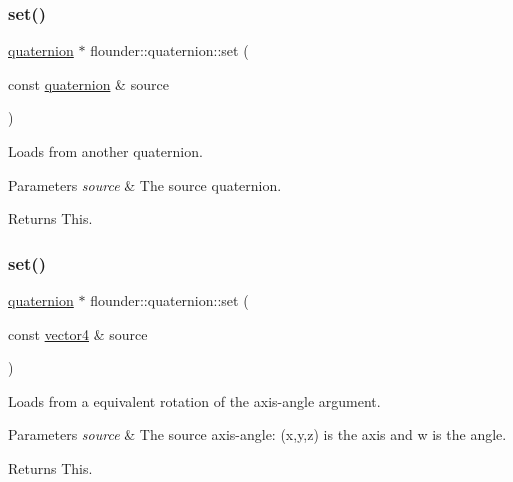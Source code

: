 \subsubsection{\texorpdfstring{set()}{set()}\hspace{0.1cm}{\footnotesize\ttfamily [2/5]}}
{\footnotesize\ttfamily \hyperlink{classflounder_1_1quaternion}{quaternion} $\ast$ flounder\+::quaternion\+::set (\begin{DoxyParamCaption}\item[{const \hyperlink{classflounder_1_1quaternion}{quaternion} \&}]{source }\end{DoxyParamCaption})}



Loads from another quaternion. 


\begin{DoxyParams}{Parameters}
{\em source} & The source quaternion. \\
\hline
\end{DoxyParams}
\begin{DoxyReturn}{Returns}
This. 
\end{DoxyReturn}
\mbox{\label{classflounder_1_1quaternion_a499ca533df80fe442f7a541c369fa008}} 
\subsubsection{\texorpdfstring{set()}{set()}\hspace{0.1cm}{\footnotesize\ttfamily [3/5]}}
{\footnotesize\ttfamily \hyperlink{classflounder_1_1quaternion}{quaternion} $\ast$ flounder\+::quaternion\+::set (\begin{DoxyParamCaption}\item[{const \hyperlink{classflounder_1_1vector4}{vector4} \&}]{source }\end{DoxyParamCaption})}



Loads from a equivalent rotation of the axis-\/angle argument. 


\begin{DoxyParams}{Parameters}
{\em source} & The source axis-\/angle\+: (x,y,z) is the axis and w is the angle. \\
\hline
\end{DoxyParams}
\begin{DoxyReturn}{Returns}
This. 
\end{DoxyReturn}
\mbox{\label{classflounder_1_1quaternion_a047888cd985bda85c4707e14b79c17bd}} 
